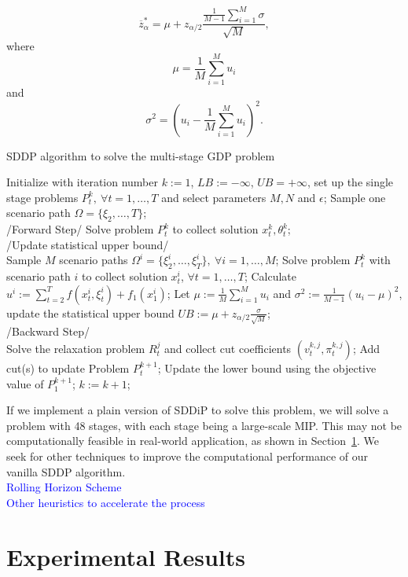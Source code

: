 \documentclass[12pt]{article}
\begin{document}
	\begin{equation}
		\overline{z}^*_\alpha = \mu + z_{\alpha/2} \frac{\frac{1}{M-1}\sum_{i = 1}^{M} \sigma}{\sqrt{M}},
	\end{equation}
	where 
	\[\mu = \frac{1}{M}\sum_{i = 1}^{M} u_i \]
	and
	\[\sigma^2 = (u_i - \frac{1}{M}\sum_{i = 1}^{M} u_i)^2.\]
	\begin{algorithm}[H]
		\caption{SDDP algorithm to solve the multi-stage GDP problem}
		\label{alg:SDDP}
		\begin{algorithmic}[1]
			\State Initialize with iteration number \(k := 1\), \(LB := -\infty\), \(UB = +\infty\), set up the single stage problems \(P_t^k,\ \forall t = 1, \dots, T\) and select parameters \(M, N\) and \(\epsilon\);
			\State Sample one scenario path \(\Omega = \{\xi_2, \dots, T\}\); \\
			\State /Forward Step/
			\State Solve problem \(P_t^k\) to collect solution \(x_t^k, \theta_t^k\);
			\EndFor\\
			\State /Update statistical upper bound/\\
			\State Sample \(M\) scenario paths \(\Omega^i = \{\xi^i_2, \dots, \xi^i_T\}, \ \forall i = 1, \dots, M\);
			\State Solve problem \(P_t^k\) with scenario path \(i\) to collect solution \(x_t^i\), \(\forall t = 1, \dots, T\);
			\State Calculate \(u^i := \sum_{t = 2}^{T} f(x_t^i, \xi_t^i) + f_1(x_1^i)\);
			\EndFor
			\State Let \(\mu := \frac{1}{M} \sum_{i = 1}^{M} u_i\) and \(\sigma^2 := \frac{1}{M-1} (u_i - \mu)^2\), update the statistical upper bound \(UB := \mu + z_{\alpha/2}\frac{\sigma}{\sqrt{M}}\);
			\EndIf\\
			\State /Backward Step/\\
			\State Solve the relaxation problem \(R_t^j\) and collect cut coefficients \((v_t^{k,j}, \pi_t^{k,j})\);
			\EndFor
			\State Add cut(s) to update Problem \(P_t^{k+1}\);
			\EndFor
			\State Update the lower bound using the objective value of \(P_1^{k+1}\);
			\State \(k := k + 1\);
			\EndWhile
		\end{algorithmic}
	\end{algorithm}
	\noindent If we implement a plain version of SDDiP to solve this problem, we will solve a problem with 48 stages, with each stage being a large-scale MIP. This may not be computationally feasible in real-world application, as shown in Section~\ref{expResults}. We seek for other techniques to improve the computational performance of our vanilla SDDP algorithm.\\
	\newline
	\textcolor{blue}{Rolling Horizon Scheme}\\
	\textcolor{blue}{Other heuristics to accelerate the process}
\section{Experimental Results}\label{expResults}

\nocite{*}


\end{document}

